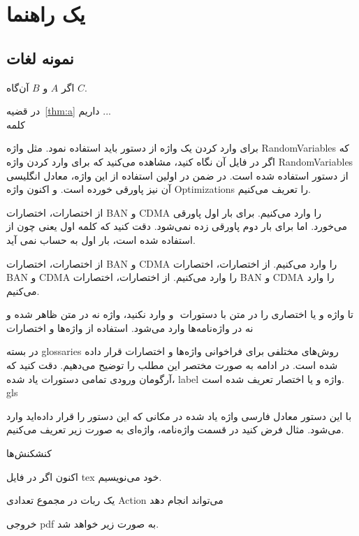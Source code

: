 \chapter{یک راهنما}\label{chp:chap4}
\thispagestyle{empty}
\rhead{\leftmark}
\section{نمونه لغات}
\begin{thm}\label{thm:a}
اگر $A$ و $B$ آن‌گاه $C$.
\end{thm}
در قضیه~\ref{thm:a} داریم ... \\
کلمه

برای وارد کردن یک واژه از دستور 
باید استفاده نمود. مثل واژه 
\glspl{RandomVariable}
که اگر در فایل \lr{\TeX}  آن نگاه کنید، مشاهده می‌کنید که برای وارد کردن واژه  \glspl{RandomVariable} از دستور  استفاده شده است. در ضمن  در اولین استفاده از این واژه، معادل انگلیسی آن نیز پاورقی خورده است.  و اکنون واژه \glspl{Optimization}  را تعریف می‌کنیم. 

از اختصارات، اختصارات \gls*{BAN} و \gls{CDMA} را وارد می‌کنیم. برای بار اول پاورقی می‌خورد. اما برای بار دوم پاورقی زده نمی‌شود. دقت کنید که کلمه اول یعنی چون از  استفاده شده است، بار اول به حساب نمی آید. 

از اختصارات، اختصارات \gls{BAN} و \gls{CDMA} را وارد می‌کنیم. 
از اختصارات، اختصارات \gls{BAN} و \gls{CDMA} را وارد می‌کنیم. 
از اختصارات، اختصارات \gls{BAN} و \gls{CDMA} را وارد می‌کنیم. 

تا واژه و یا اختصاری را در متن با دستورات ‌ و  وارد نکنید، واژه نه در متن ظاهر شده و نه در واژه‌نامه‌ها وارد می‌شود.
\cite{Vahedi87,Amintoosi87afzayesh}\cite{Ri2014}
استفاده از واژه‌ها و اختصارات

در بسته glossaries روش‌های مختلفی برای فراخوانی واژه‌ها و اختصارات قرار داده شده است. در ادامه به صورت مختصر این مطلب را توضیح می‌دهیم. دقت کنید که آرگومان ورودی تمامی دستورات یاد شده، label واژه و یا اختصار تعریف شده است.
gls

با این دستور معادل فارسی واژه یاد شده در مکانی که این دستور را قرار داده‌اید وارد می‌شود. مثال فرض کنید در قسمت واژه‌نامه، واژه‌ای به صورت زیر تعریف می‌کنیم.

{کنش}{کنش‌ها}

اکنون اگر در فایل tex خود می‌نویسیم.

یک ربات در مجموع تعدادی ‪\gls{Action}‬ می‌تواند انجام دهد

خروجی pdf به صورت زیر خواهد شد.

